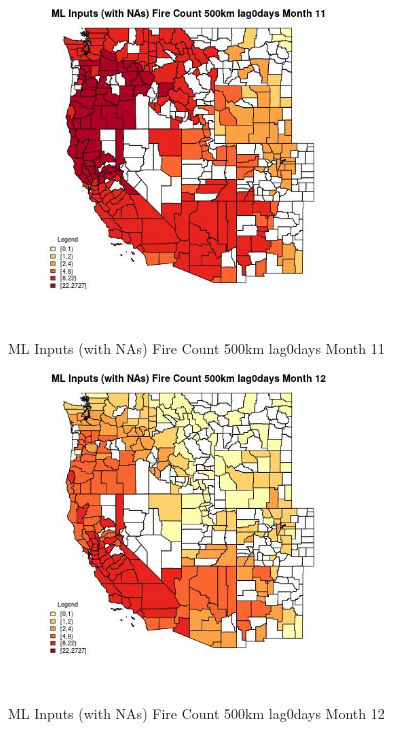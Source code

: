 \begin{figure} 
\centering  
\includegraphics[width=0.77\textwidth]{Code_Outputs/Report_ML_input_PM25_Step4_part_f_de_duplicated_aves_prioritize_24hr_obswNAs_CountyFire_Count_500km_lag0daysmedianMonth11.jpg} 
\caption{\label{fig:Report_ML_input_PM25_Step4_part_f_de_duplicated_aves_prioritize_24hr_obswNAsCountyFire_Count_500km_lag0daysmedianMonth11}ML Inputs (with NAs) Fire Count 500km lag0days Month 11} 
\end{figure} 
 

\begin{figure} 
\centering  
\includegraphics[width=0.77\textwidth]{Code_Outputs/Report_ML_input_PM25_Step4_part_f_de_duplicated_aves_prioritize_24hr_obswNAs_CountyFire_Count_500km_lag0daysmedianMonth12.jpg} 
\caption{\label{fig:Report_ML_input_PM25_Step4_part_f_de_duplicated_aves_prioritize_24hr_obswNAsCountyFire_Count_500km_lag0daysmedianMonth12}ML Inputs (with NAs) Fire Count 500km lag0days Month 12} 
\end{figure} 
 


